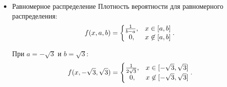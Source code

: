 \begin{itemize}
\item{Равномерное распределение}
Плотность вероятности для равномерного распределения:
\begin{equation} 
f(x, a, b) = \left\{
\begin{matrix}
{1 \over b-a}, & x\in [a,b] \\
0, & x\not\in [a,b]
\end{matrix}
\right..
\end{equation}

При \( a = -\sqrt{3} \) и \( b = \sqrt{3} \):
\begin{equation} 
f(x, -\sqrt{3}, \sqrt{3}) = \left\{
\begin{matrix}
{1 \over 2\sqrt{3}}, & x\in [-\sqrt{3},\sqrt{3}] \\
0, & x\not\in [-\sqrt{3},\sqrt{3}]
\end{matrix}
\right..
\end{equation}

\end{itemize}
